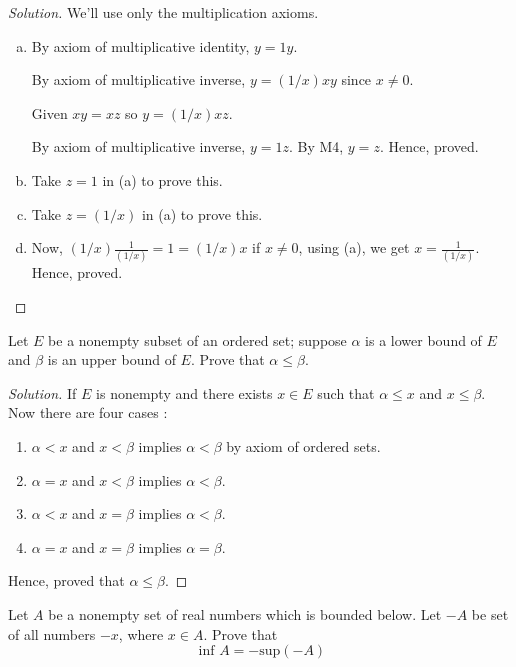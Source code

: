 \begin{proof}[Solution]
    We'll use only the multiplication axioms.
    \begin{enumerate}[a)]
        \item 
            By axiom of multiplicative identity, $y = 1y$.         
            
            By axiom of multiplicative inverse, $y = (1/x) x y$ since $x \neq 0$. 

            Given $xy = xz$ so $y = (1/x) x z$.

            By axiom of multiplicative inverse, $y = 1z$. By M4, $y = z$. Hence, proved. 
        
        \item Take $z = 1$ in (a) to prove this.
        \item Take $z = (1/x)$ in (a) to prove this.
        \item Now, $(1/x) \frac{1}{(1/x)} = 1 = (1/x) x $ if $x \neq 0$, using (a), 
        we get $x = \frac{1}{(1/x)}$. Hence, proved.
    \end{enumerate}
\end{proof}

\begin{prblm}
    Let $E$ be a nonempty subset of an ordered set; 
    suppose $\alpha$ is a lower bound of $E$ and $\beta$ is an upper bound of $E$.
    Prove that $\alpha \leq \beta$.
\end{prblm}

\begin{proof}[Solution]
    If $E$ is nonempty and there exists $x \in E$ such that $\alpha \leq x$ and $x \leq \beta$.
    Now there are four cases : 
    \begin{enumerate}
        \item $\alpha < x$ and $x < \beta$ implies $\alpha < \beta$ by axiom of ordered sets.
        \item $\alpha = x$ and $x < \beta$ implies $\alpha < \beta$.
        \item $\alpha < x$ and $x = \beta$ implies $\alpha < \beta$.
        \item $\alpha = x$ and $x = \beta$ implies $\alpha = \beta$.
    \end{enumerate}
    Hence, proved that $\alpha \leq \beta$.
\end{proof}


\begin{prblm}
    Let $A$ be a nonempty set of real numbers which is bounded below.
    Let $-A$ be set of all numbers $-x$, where $x \in A$. Prove that 
    $$ \text{ inf } A = - \text{sup}(-A) $$
\end{prblm}

